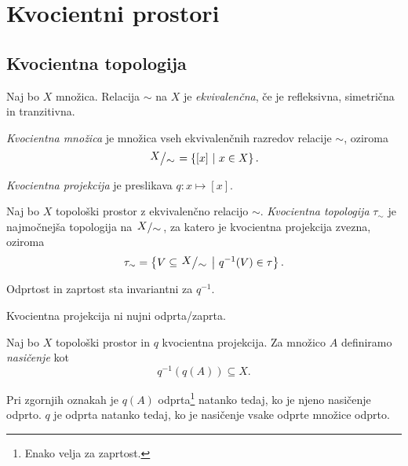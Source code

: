 \section{Kvocientni prostori}

\subsection{Kvocientna topologija}


\begin{definicija}
Naj bo $X$ množica. Relacija $\sim$ na $X$ je
\emph{ekvivalenčna}, če je refleksivna,
simetrična in tranzitivna.
\end{definicija}

\begin{definicija}
\emph{Kvocientna množica} je množica vseh
ekvivalenčnih razredov relacije $\sim$, oziroma
\[
\kvoc{X}{\sim} = \setb{[x]}{x \in X}.
\]
\end{definicija}

\begin{definicija}
\emph{Kvocientna projekcija} je
preslikava $q \colon x \mapsto [x]$.
\end{definicija}

\begin{definicija}
Naj bo $X$ topološki prostor z ekvivalenčno relacijo $\sim$.
\emph{Kvocientna topologija}
$\tau_\sim$ je najmočnejša topologija na $\kvoc{X}{\sim}$, za
katero je kvocientna projekcija zvezna, oziroma
\[
\tau_\sim = \setb{V \subseteq \kvoc{X}{\sim}}{q^{-1}(V) \in \tau}.
\]
\end{definicija}

\begin{opomba}
Odprtost in zaprtost sta invariantni za $q^{-1}$.
\end{opomba}

\begin{opomba}
Kvocientna projekcija ni nujni odprta/zaprta.
\end{opomba}

\begin{definicija}
Naj bo $X$ topološki prostor in $q$ kvocientna projekcija. Za
množico $A$ definiramo \emph{nasičenje} kot
\[
q^{-1}(q(A)) \subseteq X.
\]
\end{definicija}

\begin{trditev}
Pri zgornjih oznakah je $q(A)$ odprta\footnote{Enako velja za
zaprtost.} natanko tedaj, ko je njeno nasičenje odprto. $q$ je
odprta natanko tedaj, ko je nasičenje vsake odprte množice odprto.
\end{trditev}

\obvs

